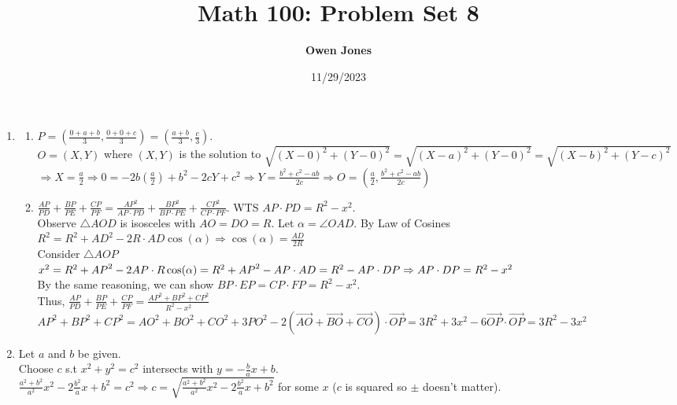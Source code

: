 \documentclass[10pt]{article}
\title{\bf Math 100: Problem Set 8}
\date{11/29/2023}
\author{\bf Owen Jones}
\begin{document}
\maketitle
\begin{enumerate}[label= (Q-\arabic*)]
    \item \begin{enumerate}[label= (\alph*)]
        \item $P=(\frac{0+a+b}{3},\frac{0+0+c}{3})=(\frac{a+b}{3},\frac{c}{3})$.\\ 
        $O=(X,Y)$ where $(X,Y)$ is the solution to $\sqrt{{(X-0)}^2+{(Y-0)}^2}=\sqrt{{(X-a)}^2+{(Y-0)}^2}=\sqrt{{(X-b)}^2+{(Y-c)}^2}$\\
        $\Rightarrow X=\frac{a}{2}\Rightarrow 0=-2b(\frac{a}{2})+b^2-2cY+c^2\Rightarrow Y=\frac{b^2+c^2-ab}{2c}\Rightarrow O=(\frac{a}{2},\frac{b^2+c^2-ab}{2c})$
        \item $\frac{AP}{PD}+\frac{BP}{PE}+\frac{CP}{PF}=\frac{{AP}^2}{AP\cdot PD}+\frac{{BP}^2}{BP\cdot PE}+\frac{{CP}^2}{CP\cdot PF}$.
        WTS $AP\cdot PD=R^2-x^2$.\\ 
        Observe $\triangle AOD$ is isosceles with $AO=DO=R$. Let $\alpha=\angle OAD$. By Law of Cosines $R^2=R^2+{AD}^2-2R\cdot{AD}\cos(\alpha)\Rightarrow \cos(\alpha)=\frac{AD}{2R}$\\
        Consider $\triangle AOP$\\
        $x^2=R^2+{AP}^2-2AP\cdot R\cos(\alpha)\\
        =R^2+{AP}^2-{AP}\cdot AD=R^2-AP\cdot DP\\
        \Rightarrow AP\cdot DP=R^2-x^2$\\
        By the same reasoning, we can show $BP\cdot EP=CP\cdot FP=R^2-x^2$.\\
        Thus, $\frac{AP}{PD}+\frac{BP}{PE}+\frac{CP}{PF}=\frac{{AP}^2+{BP}^2+{CP}^2}{R^2-x^2}$\\
        ${AP}^2+{BP}^2+{CP}^2={AO}^2+{BO}^2+{CO}^2+3{PO}^2-2(\vec{AO}+\vec{BO}+\vec{CO})\cdot \vec{OP}=3R^2+3x^2-6\vec{OP}\cdot\vec{OP}=3R^2-3x^2$
    \end{enumerate}
    \item Let $a$ and $b$ be given.\\
        Choose $c$ s.t $x^2+y^2=c^2$ intersects with $y=-\frac{b}{a}x+b$.\\
        $\frac{a^2+b^2}{a^2}x^2-2\frac{b^2}{a}x+b^2=c^2\Rightarrow c=\sqrt{\frac{a^2+b^2}{a^2}x^2-2\frac{b^2}{a}x+b^2}$ for some $x$ ($c$ is squared so $\pm$ doesn't matter).\\

\end{enumerate}
\end{document}
